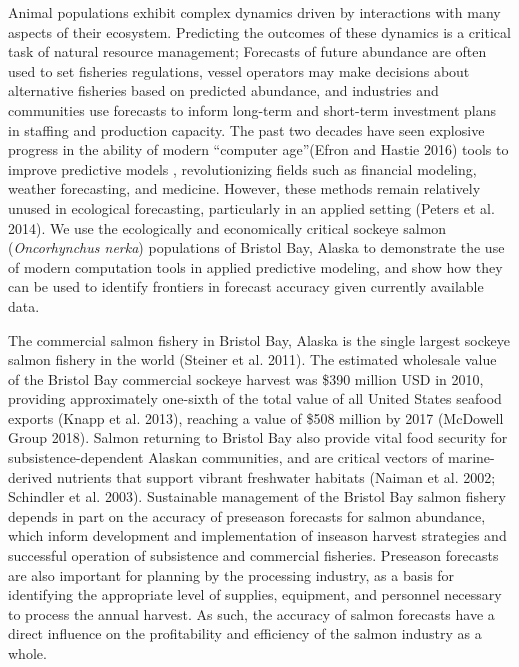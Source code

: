 \documentclass[
]{article}
\begin{document}
Animal populations exhibit complex dynamics driven by interactions with many aspects of their ecosystem. Predicting the outcomes of these dynamics is a critical task of natural resource management; Forecasts of future abundance are often used to set fisheries regulations, vessel operators may make decisions about alternative fisheries based on predicted abundance, and industries and communities use forecasts to inform long-term and short-term investment plans in staffing and production capacity. The past two decades have seen explosive progress in the ability of modern ``computer age''(Efron and Hastie 2016) tools to improve predictive models , revolutionizing fields such as financial modeling, weather forecasting, and medicine. However, these methods remain relatively unused in ecological forecasting, particularly in an applied setting (Peters et al. 2014). We use the ecologically and economically critical sockeye salmon (\emph{Oncorhynchus nerka}) populations of Bristol Bay, Alaska to demonstrate the use of modern computation tools in applied predictive modeling, and show how they can be used to identify frontiers in forecast accuracy given currently available data.

The commercial salmon fishery in Bristol Bay, Alaska is the single largest sockeye salmon fishery in the world (Steiner et al. 2011). The estimated wholesale value of the Bristol Bay commercial sockeye harvest was \$390 million USD in 2010, providing approximately one-sixth of the total value of all United States seafood exports (Knapp et al. 2013), reaching a value of \$508 million by 2017 (McDowell Group 2018). Salmon returning to Bristol Bay also provide vital food security for subsistence-dependent Alaskan communities, and are critical vectors of marine-derived nutrients that support vibrant freshwater habitats (Naiman et al. 2002; Schindler et al. 2003). Sustainable management of the Bristol Bay salmon fishery depends in part on the accuracy of preseason forecasts for salmon abundance, which inform development and implementation of inseason harvest strategies and successful operation of subsistence and commercial fisheries. Preseason forecasts are also important for planning by the processing industry, as a basis for identifying the appropriate level of supplies, equipment, and personnel necessary to process the annual harvest. As such, the accuracy of salmon forecasts have a direct influence on the profitability and efficiency of the salmon industry as a whole.
\end{document}
